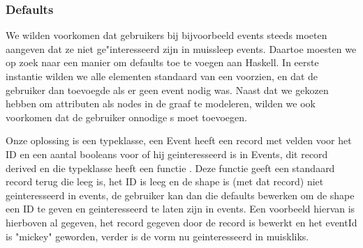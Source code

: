 \subsubsection{Defaults}
We wilden voorkomen dat gebruikers bij bijvoorbeeld events steeds moeten aangeven dat ze niet ge"interesseerd zijn in muissleep events. Daartoe moesten we op zoek naar een manier om defaults toe te voegen aan Haskell. In eerste instantie wilden we alle elementen standaard van een  voorzien, en dat de gebruiker dan  toevoegde als er geen event nodig was. Naast dat we gekozen hebben om attributen als nodes in de graaf te modeleren, wilden we ook voorkomen dat de gebruiker onnodige s moet toevoegen.

Onze oplossing is een  typeklasse, een Event heeft een record met velden voor het ID en een aantal booleans voor of hij geinteresseerd is in Events, dit record derived  en die typeklasse heeft een functie . Deze functie geeft een standaard record terug die leeg is, het ID is leeg en de shape is (met dat record) niet geinteresseerd in events, de gebruiker kan dan die defaults bewerken om de shape een ID te geven en geinteresseerd te laten zijn in events. Een voorbeeld hiervan is hierboven al gegeven, het record gegeven door de  record is bewerkt en het eventId is "mickey" geworden, verder is de vorm nu geinteresseerd in muiskliks.

